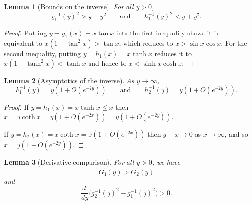 \documentclass[12pt,reqno]{amsart}
\newtheorem{lemma}[lemma]{Lemma}
\theoremstyle{definition}
\newcommand{\go}{G_1}
\newcommand{\gt}{G_2}
\begin{document}
%
\begin{lemma}[Bounds on the inverse]\label{inversebounds}
For all $y>0$,  
\[
g_1^{-1}(y)^2 > y - y^2  \qquad \text{and} \qquad h_1^{-1}(y)^2 < y + y^2 .
\]
\end{lemma}
%
\begin{proof}
Putting $y=g_1(x)=x \tan x$ into the first inequality shows it is equivalent to $x(1+\tan^2 x) > \tan x$, which reduces to $x > \sin x \cos x$. For the second inequality, putting $y=h_1(x)=x \tanh x$ reduces it to $x(1-\tanh^2 x) < \tanh x$ and hence to $x < \sinh x \cosh x$.
\end{proof}
%
%
\begin{lemma}[Asymptotics of the inverse]\label{inverseasymptotics} As $y \to \infty$, 
\[
h_1^{-1}(y) = y \left( 1 + O(e^{-2y}) \right) \qquad \text{and} \qquad h_2^{-1}(y) = y \left( 1 + O(e^{-2y}) \right) .
\] 
\end{lemma}
%
\begin{proof}
If $y=h_1(x)=x \tanh x \leq x$ then $x=y \coth x = y \left( 1 + O(e^{-2x}) \right) = y \left( 1 + O(e^{-2y}) \right)$. 

If $y=h_2(x)=x \coth x = x \left( 1 + O(e^{-2x}) \right)$ then $y-x \to 0$ as $x \to \infty$, and so $x=y \left( 1 + O(e^{-2y}) \right)$. 
\end{proof}
%
\begin{lemma}[Derivative comparison]\label{derivcomparison}
For all $y>0$, we have 
%
\begin{equation} \label{Hderiv}
\go^\prime(y) > \gt^\prime(y) 
\end{equation}
%
and 
%
\begin{equation} \label{inversederiv}
\frac{d\ }{dy} \big( g_2^{-1}(y)^2 - g_1^{-1}(y)^2 \big) > 0 .
\end{equation}
%
\end{lemma}
%
\end{document}
